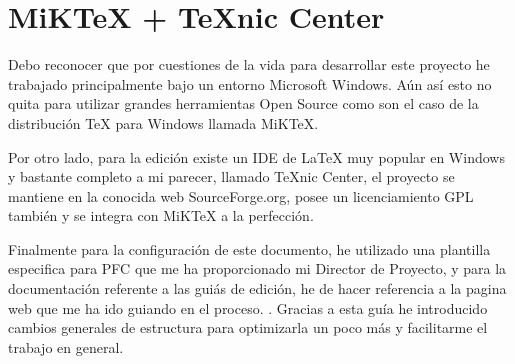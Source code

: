 
\section*{MiK\TeX{}  + \TeX nic Center}

Debo reconocer que por cuestiones de la vida para desarrollar este proyecto he trabajado principalmente bajo un entorno Microsoft Windows. Aún así esto no quita para utilizar grandes herramientas Open Source como son el caso de la distribución \TeX{} para Windows llamada MiK\TeX \cite{website:miktex}. 

Por otro lado, para la edición existe un IDE de \LaTeX{} muy popular en Windows y bastante completo a mi parecer, llamado \TeX nic Center, el proyecto se mantiene en la conocida web SourceForge.org, posee un licenciamiento GPL también y se integra con MiK\TeX{} a la perfección.

Finalmente para la configuración de este documento, he utilizado una plantilla especifica para PFC que me ha proporcionado mi Director de Proyecto, y para la documentación referente a las guiás de edición, he de hacer referencia a la pagina web que me ha ido guiando en el proceso. \cite{website:latex}. Gracias a esta guía he introducido cambios generales de estructura para optimizarla un poco más y facilitarme el trabajo en general.
